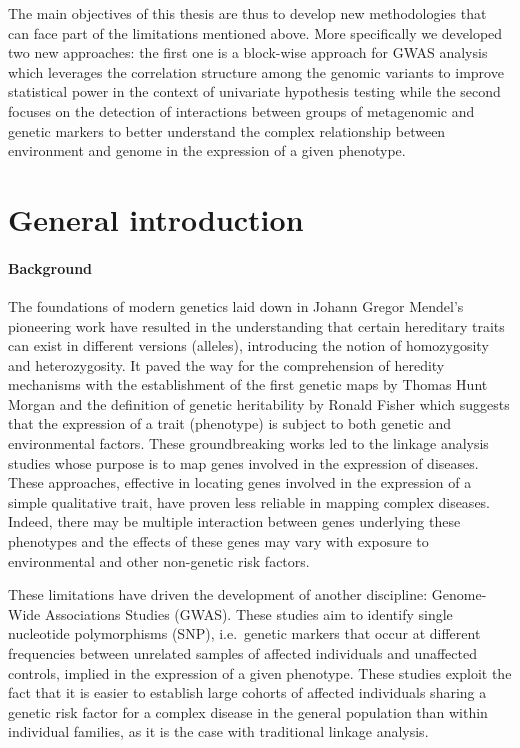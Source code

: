 \documentclass[]{book}
\begin{document}
The main objectives of this thesis are thus to develop new methodologies that can face part of the limitations mentioned above. More specifically we developed two new approaches: the first one is a block-wise approach for GWAS analysis which leverages the correlation structure among the genomic variants to improve statistical power in the context of univariate hypothesis testing while the second focuses on the detection of interactions between groups of metagenomic and genetic markers to better understand the complex relationship between environment and genome in the expression of a given phenotype.

\hypertarget{intro}{%
\chapter*{General introduction}\label{intro}}

\hypertarget{background}{%
\subsubsection*{Background}\label{background}}

The foundations of modern genetics laid down in Johann Gregor Mendel's
pioneering work have resulted in the understanding that certain
hereditary traits can exist in different versions (alleles), introducing
the notion of homozygosity and heterozygosity. It paved the way for the
comprehension of heredity mechanisms with the establishment of the first
genetic maps by Thomas Hunt Morgan and the definition of genetic
heritability by Ronald Fisher which suggests that the expression of a
trait (phenotype) is subject to both genetic and environmental factors.
These groundbreaking works led to the linkage analysis studies whose
purpose is to map genes involved in the expression of diseases. These
approaches, effective in locating genes involved in the expression of a
simple qualitative trait, have proven less reliable in mapping complex
diseases. Indeed, there may be multiple interaction between genes
underlying these phenotypes and the effects of these genes may vary with
exposure to environmental and other non-genetic risk factors.

These limitations have driven the development of another discipline:
Genome-Wide Associations Studies (GWAS). These studies aim to identify
single nucleotide polymorphisms (SNP), i.e.~genetic markers that occur
at different frequencies between unrelated samples of affected
individuals and unaffected controls, implied in the expression of a
given phenotype. These studies exploit the fact that it is easier to
establish large cohorts of affected individuals sharing a genetic risk
factor for a complex disease in the general population than within
individual families, as it is the case with traditional linkage
analysis.
\end{document}

